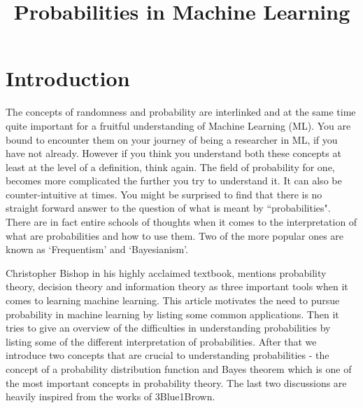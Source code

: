 \documentclass{../template/texnote}
\title{\textbf{Probabilities in Machine Learning}}[author={Linn Abraham}]
\begin{document}
    \maketitle {}


\section{Introduction}

The concepts of randomness and probability are interlinked and at the same time quite important for a fruitful understanding of Machine Learning (ML).
You are bound to encounter them on your journey of being a researcher in ML, if you have not already. 
However if you think you understand both these concepts at least at the level of a definition, think again.
The field of probability for one, becomes more complicated the further you try to understand it. It can also be counter-intuitive at times. 
You might be surprised to find that there is no straight forward answer to the question of what is meant by ``probabilities".
There are in fact entire schools of thoughts when it comes to the interpretation of what are probabilities and how to use them. Two of the more popular ones are known as `Frequentism' and `Bayesianism'.


Christopher Bishop \nocite{bishop_pattern_2006} in his highly acclaimed textbook, mentions probability theory, decision theory and information theory as three important tools when it comes to learning machine learning.
This article motivates the need to pursue probability in machine learning by listing some common applications. Then it tries to give an overview of the difficulties in understanding probabilities by listing some of the different interpretation of probabilities. After that we introduce two concepts that are crucial to understanding probabilities - the concept of a probability distribution function and Bayes theorem which is one of the most important concepts in probability theory. 
The last two discussions are heavily inspired from the works of 3Blue1Brown. \nocite{3b1b}


\end{document}
